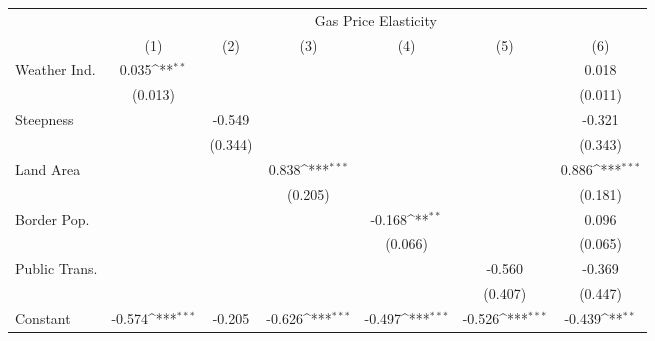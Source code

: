 {
\def\sym#1{\ifmmode^{#1}\else\(^{#1}\)\fi}
\begin{tabular}{l*{6}{c}}
\hline\hline
            &\multicolumn{6}{c}{Gas Price Elasticity}                                                                                           \\
            &\multicolumn{1}{c}{(1)}         &\multicolumn{1}{c}{(2)}         &\multicolumn{1}{c}{(3)}         &\multicolumn{1}{c}{(4)}         &\multicolumn{1}{c}{(5)}         &\multicolumn{1}{c}{(6)}         \\
\hline
Weather Ind.&       0.035\sym{**} &                     &                     &                     &                     &       0.018         \\
            &     (0.013)         &                     &                     &                     &                     &     (0.011)         \\
[1em]
Steepness   &                     &      -0.549         &                     &                     &                     &      -0.321         \\
            &                     &     (0.344)         &                     &                     &                     &     (0.343)         \\
[1em]
Land Area   &                     &                     &       0.838\sym{***}&                     &                     &       0.886\sym{***}\\
            &                     &                     &     (0.205)         &                     &                     &     (0.181)         \\
[1em]
Border Pop. &                     &                     &                     &      -0.168\sym{**} &                     &       0.096         \\
            &                     &                     &                     &     (0.066)         &                     &     (0.065)         \\
[1em]
Public Trans.&                     &                     &                     &                     &      -0.560         &      -0.369         \\
            &                     &                     &                     &                     &     (0.407)         &     (0.447)         \\
[1em]
Constant    &      -0.574\sym{***}&      -0.205         &      -0.626\sym{***}&      -0.497\sym{***}&      -0.526\sym{***}&      -0.439\sym{**} \\

\end{tabular}}
